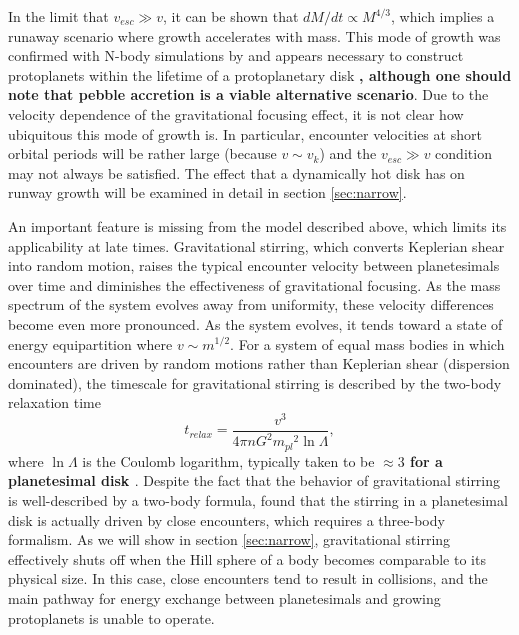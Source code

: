 \documentclass[twocolumn,linenumbers]{aastex63}
\begin{document}
In the limit that $v_{esc} \gg v$, it can be shown that $dM/dt \propto
M^{4/3}$, which implies a runaway scenario where growth
accelerates with mass. This mode of growth was confirmed with N-body
simulations by \citet{kokubo96} and appears necessary to construct
protoplanets within the lifetime of a protoplanetary disk \textbf{\citep{lissauer87}, although one should note that pebble accretion \citep{lambrechts12, lambrechts14, bitsch15} is a viable alternative scenario}. Due to the
velocity dependence of the gravitational focusing effect, it is not clear how ubiquitous this mode of growth is. In particular, encounter velocities at short orbital periods will be rather large (because $v \sim v_{k}$) and the $v_{esc} \gg v$ condition may not always be satisfied. The effect that a dynamically hot disk has on runway growth will be examined in detail in section \ref{sec:narrow}.

An important feature is missing from the model described above, which
limits its applicability at late times. Gravitational stirring, which converts
Keplerian shear into random motion, raises the typical encounter velocity
between planetesimals over time \citep{weidenschilling89, ida90} and diminishes the effectiveness of gravitational
focusing. As the mass spectrum of the system evolves away from uniformity, these velocity differences become even more
pronounced. As the system evolves, it tends toward a state of
energy equipartition where $v \sim m^{1/2}$. For a system of equal mass bodies in which encounters are driven by random 
motions rather than Keplerian shear (dispersion dominated), the timescale for gravitational stirring is described by the two-body 
relaxation time \citep{ida93}
\begin{equation}\label{eq:relax}
	t_{relax} = \frac{v^3}{4 \pi n G^2 {m_{pl}}^2 \ln \Lambda},
\end{equation}
where $\ln \Lambda$ is the Coulomb logarithm,
typically taken to be \textbf{$\approx 3$ for a planetesimal disk \citep{ida90, stewart00}}. Despite
the fact that the behavior of gravitational stirring is well-described
by a two-body formula, \citep{ida93} found that the stirring in a planetesimal disk is actually driven by close encounters, which 
requires a three-body formalism. As we will show in section \ref{sec:narrow}, gravitational stirring effectively shuts off when the 
Hill sphere of a body becomes comparable to its physical size. In this case, close encounters tend to result in collisions, and the 
main pathway for energy exchange between planetesimals and growing protoplanets is unable to operate.
\end{document}
